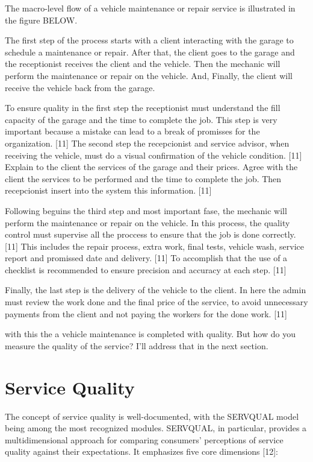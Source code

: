 The macro-level flow of a vehicle maintenance or repair service is illustrated in the figure BELOW. 

The first step of the process starts with a client interacting with the garage to schedule a maintenance or repair. 
After that, the client goes to the garage and the receptionist receives the client and the vehicle.
Then the mechanic will perform the maintenance or repair on the vehicle.
And, Finally, the client will receive the vehicle back from the garage.

To ensure quality in the first step the receptionist must understand the fill capacity of the garage and the time to complete the job. 
This step is very important because a mistake can lead to a break of promisses for the organization. [11]
The second step the recepcionist and service advisor, when receiving the vehicle, must do a visual confirmation of the vehicle condition. [11]
Explain to the client the services of the garage and their prices. Agree with the client the services to be performed and the time to complete the job. 
Then recepcionist insert into the system this information. [11]

Following beguins the third step and most important fase, the mechanic will perform the maintenance or repair on the vehicle. 
In this process, the quality control must supervise all the proccess to ensure that the job is done correctly. [11]
This includes the repair process, extra work, final tests, vehicle wash, service report and promissed date and delivery. [11]
To accomplish that the use of a checklist is recommended to ensure precision and accuracy at each step. [11]

Finally, the last step is the delivery of the vehicle to the client. 
In here  the admin must review the work done and the final price of the service, to avoid unnecessary payments from the client and not paying the workers for the done work. [11]

with this the a vehicle maintenance is completed with quality. 
But how do you measure the quality of the service?
I'll address that in the next section.

\section{Service Quality}
The concept of service quality is well-documented, with the SERVQUAL model being among the most recognized modules. 
SERVQUAL, in particular, provides a multidimensional approach for comparing consumers’ perceptions of service quality against their expectations. 
It emphasizes five core dimensions [12]:

